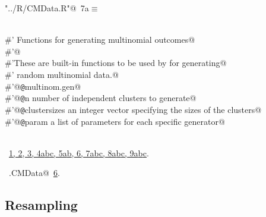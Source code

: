 \documentclass[reqno]{amsart}
\renewcommand{\NWtarget}[2]{\hypertarget{#1}{#2}}
\renewcommand{\NWlink}[2]{\hyperlink{#1}{#2}}
\begin{document}
\begin{flushleft} \small\label{scrap10}\raggedright\small
\NWtarget{nuweb7a}{} \verb@"../R/CMData.R"@\nobreak\ {\footnotesize {7a}}$\equiv$
\vspace{-1ex}
\begin{list}{}{} \item
\mbox{}\verb@@\\
\mbox{}\verb@#' Functions for generating multinomial outcomes@\\
\mbox{}\verb@#'@\\
\mbox{}\verb@#'These are built-in functions to be used by  for generating@\\
\mbox{}\verb@#' random multinomial data.@\\
\mbox{}\verb@#'@{\tt @}\verb@name multinom.gen@\\
\mbox{}\verb@#'@{\tt @}\verb@param n number of independent clusters to generate@\\
\mbox{}\verb@#'@{\tt @}\verb@param clustersizes an integer vector specifying the sizes of the clusters@\\
\mbox{}\verb@#'@{\tt @}\verb@param param a list of parameters for each specific generator@\\
\mbox{}\verb@NULL@\\
\mbox{}\verb@@{\NWsep}
\end{list}
\vspace{-1.5ex}
\footnotesize
\begin{list}{}{\setlength{\itemsep}{-\parsep}\setlength{\itemindent}{-\leftmargin}}
\item \NWtxtFileDefBy\ \NWlink{nuweb1}{1}\NWlink{nuweb2}{, 2}\NWlink{nuweb3}{, 3}\NWlink{nuweb4a}{, 4a}\NWlink{nuweb4b}{b}\NWlink{nuweb4c}{c}\NWlink{nuweb5a}{, 5a}\NWlink{nuweb5b}{b}\NWlink{nuweb6}{, 6}\NWlink{nuweb7a}{, 7a}\NWlink{nuweb7b}{b}\NWlink{nuweb7c}{c}\NWlink{nuweb8a}{, 8a}\NWlink{nuweb8b}{b}\NWlink{nuweb8c}{c}\NWlink{nuweb9a}{, 9a}\NWlink{nuweb9b}{b}\NWlink{nuweb9c}{c}.
\item \NWtxtIdentsUsed\nobreak\  \verb@ran.CMData@\nobreak\ \NWlink{nuweb6}{6}.
\item{}
\end{list}
\vspace{4ex}
\end{flushleft}
\subsection{Resampling}
\end{document}
